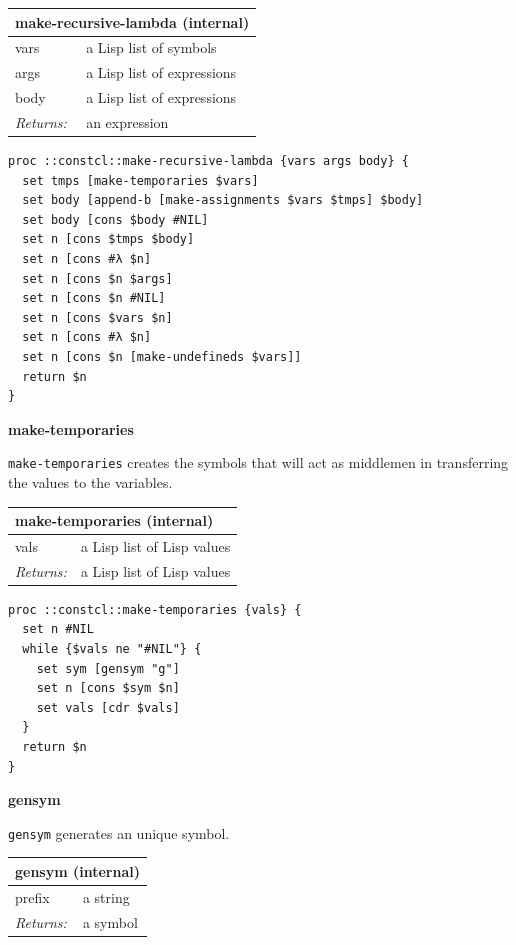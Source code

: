 \documentclass[twoside,9pt]{report}
\begin{document}
\begin{tabular}{ |l l| }
\hline
\multicolumn{2}{|l|}{make-recursive-lambda (internal)} \\
\hline
vars & a Lisp list of symbols \\
args & a Lisp list of expressions \\
body & a Lisp list of expressions \\
\textit{Returns:} & an expression \\
\hline
\end{tabular}

\noindent\makebox[\linewidth]{\rule{\linewidth}{0.4pt}}
\begin{lstlisting}
proc ::constcl::make-recursive-lambda {vars args body} {
  set tmps [make-temporaries $vars]
  set body [append-b [make-assignments $vars $tmps] $body]
  set body [cons $body #NIL]
  set n [cons $tmps $body]
  set n [cons #λ $n]
  set n [cons $n $args]
  set n [cons $n #NIL]
  set n [cons $vars $n]
  set n [cons #λ $n]
  set n [cons $n [make-undefineds $vars]]
  return $n
}
\end{lstlisting}
\noindent\makebox[\linewidth]{\rule{\linewidth}{0.4pt}}

\textbf{make-temporaries}


\texttt{make-temporaries} creates the symbols that will act as middlemen in transferring the values to the variables.

\begin{tabular}{ |l l| }
\hline
\multicolumn{2}{|l|}{make-temporaries (internal)} \\
\hline
vals & a Lisp list of Lisp values \\
\textit{Returns:} & a Lisp list of Lisp values \\
\hline
\end{tabular}

\noindent\makebox[\linewidth]{\rule{\linewidth}{0.4pt}}
\begin{lstlisting}
proc ::constcl::make-temporaries {vals} {
  set n #NIL
  while {$vals ne "#NIL"} {
    set sym [gensym "g"]
    set n [cons $sym $n]
    set vals [cdr $vals]
  }
  return $n
}
\end{lstlisting}
\noindent\makebox[\linewidth]{\rule{\linewidth}{0.4pt}}

\textbf{gensym}


\texttt{gensym} generates an unique symbol.

\begin{tabular}{ |l l| }
\hline
\multicolumn{2}{|l|}{gensym (internal)} \\
\hline
prefix & a string \\
\textit{Returns:} & a symbol \\
\hline
\end{tabular}
\end{document}
